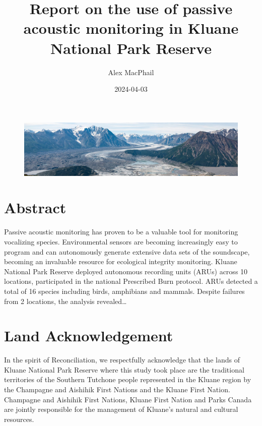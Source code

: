 \documentclass[
  letterpaper,
  DIV=11,
  numbers=noendperiod,
  oneside]{scrartcl}
\title{Report on the use of passive acoustic monitoring in Kluane
National Park Reserve}
\author{Alex MacPhail}
\date{2024-04-03}
\renewcommand*\contentsname{Table of contents}
\newcommand\contentsname{Table of contents}
\begin{document}
\maketitle
\ifdefined\Shaded\renewenvironment{Shaded}{\begin{tcolorbox}[boxrule=0pt, frame hidden, breakable, sharp corners, interior hidden, borderline west={3pt}{0pt}{shadecolor}, enhanced]}{\end{tcolorbox}}\fi

\renewcommand*\contentsname{Table of contents}
{
\hypersetup{linkcolor=}
\setcounter{tocdepth}{3}
\tableofcontents
}
\begin{figure}

{\centering \includegraphics{kluane-banner.jpg}

}

\end{figure}

\hypertarget{abstract}{%
\section{Abstract}\label{abstract}}

Passive acoustic monitoring has proven to be a valuable tool for
monitoring vocalizing species. Environmental sensors are becoming
increasingly easy to program and can autonomously generate extensive
data sets of the soundscape, becoming an invaluable resource for
ecological integrity monitoring. Kluane National Park Reserve deployed
autonomous recording units (ARUs) across 10 locations, participated in
the national Prescribed Burn protocol. ARUs detected a total of 16
species including birds, amphibians and mammals. Despite failures from 2
locations, the analysis revealed\ldots{}

\hypertarget{land-acknowledgement}{%
\section{Land Acknowledgement}\label{land-acknowledgement}}

In the spirit of Reconciliation, we respectfully acknowledge that the
lands of Kluane National Park Reserve where this study took place are
the traditional territories of the Southern Tutchone people represented
in the Kluane region by the Champagne and Aishihik First Nations and the
Kluane First Nation. Champagne and Aishihik First Nations, Kluane First
Nation and Parks Canada are jointly responsible for the management of
Kluane's natural and cultural resources.
\end{document}

